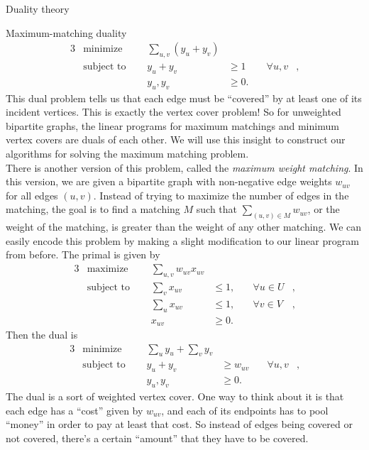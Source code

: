 \documentclass[11pt]{article}
\renewcommand{\'}{^{'}}
\begin{document}
\begin{section}{Duality theory}
\begin{subsection}{Maximum-matching duality}
	\begin{alignat}{3}
		& \text{minimize } & \sum_{u,v} (y_u + y_v)& \\
		& \text{subject to } \quad & y_u + y_v & \geq 1 & \quad \forall u,v &, \\
				    && y_u,y_v & \geq 0.
	\end{alignat}
	This dual problem tells us that each edge must be ``covered'' by at least one of its incident 
	vertices. This is exactly the vertex cover problem! So for unweighted bipartite graphs, the 
	linear programs for maximum matchings and minimum vertex covers are duals of each other. 
	We will use this insight to construct our algorithms for solving the maximum matching problem. 
	\\
	There is another version of this problem, called the \emph{maximum weight matching}. In this 
	version, we are given a bipartite graph with non-negative edge weights $w_{uv}$ for all 
	edges $(u,v)$. Instead of trying to maximize the number of edges in the matching, the goal 
	is to find a matching $M$ such that $\sum_{(u,v) \in M} w_{uv}$, or the weight of the matching, 
	is greater than the weight of any other matching. We can easily encode this problem by making 
	a slight modification to our linear program from before. The primal is given by
	\begin{alignat}{3}
		& \text{maximize } & \sum_{u,v} w_{uv}x_{uv}& \\
		& \text{subject to } \quad & \sum_{v} x_{uv} & \leq 1, & \quad \forall u\in U&, \\
				     &\quad & \sum_{u} x_{uv} & \leq 1, & \quad \forall v\in V &, \\
				&& x_{uv} & \geq 0.
	\end{alignat}
	Then the dual is
	\begin{alignat}{3}
		& \text{minimize } & \sum_{u} y_u + \sum_v y_v& \\
		& \text{subject to } \quad & y_u + y_v & \geq w_{uv} & \quad \forall u,v &, \\
				    && y_u,y_v & \geq 0.
	\end{alignat}
	The dual is a sort of weighted vertex cover. One way to think about it is that each edge 
	has a ``cost'' given by $w_{uv}$, and each of its endpoints has to pool ``money'' in order 
	to pay at least that cost. So instead of edges being covered or not covered, there's a certain 
	``amount'' that they have to be covered.
\end{subsection}


\end{section}
\end{document}
